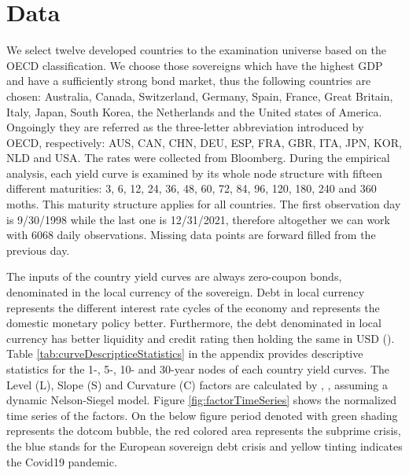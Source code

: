 \documentclass[12pt,bibliography=totoc]{article}
\begin{document}
\section{Data}

We select twelve developed countries to the examination universe based on the OECD classification. 
We choose those sovereigns which have the highest GDP and have a sufficiently strong bond market, thus the following countries are chosen: Australia, Canada, Switzerland, Germany, Spain, France, Great Britain, Italy, Japan, South Korea, the Netherlands and the United states of America. 
Ongoingly they are referred as the three-letter abbreviation introduced by OECD, respectively:  AUS, CAN, CHN, DEU, ESP, FRA, GBR, ITA, JPN, KOR, NLD and USA. 
The rates were collected from Bloomberg.
During the empirical analysis, each yield curve is examined by its whole node structure with fifteen different maturities: 3, 6, 12, 24, 36, 48, 60, 72, 84, 96, 120, 180, 240 and 360 moths. 
This maturity structure applies for all countries. 
The first observation day is 9/30/1998 while the last one is 12/31/2021, therefore altogether we can work with 6068 daily observations. 
Missing data points are forward filled from the previous day.

The inputs of the country yield curves are always zero-coupon bonds, denominated in the local currency of the sovereign. 
Debt in local currency represents the different interest rate cycles of the economy and represents the domestic monetary policy better. 
Furthermore, the debt denominated in local currency has better liquidity and credit rating then holding the same in USD  (\cite{sowmya2016linkages}). 
Table \ref{tab:curveDescripticeStatistics} in the appendix provides descriptive statistics for the 1-, 5-, 10- and 30-year nodes of each country yield curves. 
The Level (L), Slope (S) and Curvature (C) factors are calculated by \cite{diebold2006forecasting}, \cite{diebold2008global}, assuming a dynamic Nelson-Siegel model. 
Figure \ref{fig:factorTimeSeries} shows the normalized time series of the factors. 
On the below figure period denoted with green shading represents the dotcom bubble, the red colored area represents the subprime crisis, the blue stands for the European sovereign debt crisis and yellow tinting indicates the Covid19 pandemic. 
\end{document}

